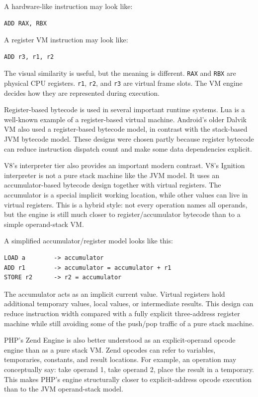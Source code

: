 \documentclass[a4paper,twoside]{report}
\begin{document}
A hardware-like instruction may look like:

\begin{verbatim}
ADD RAX, RBX
\end{verbatim}

A register VM instruction may look like:

\begin{verbatim}
ADD r3, r1, r2
\end{verbatim}

The visual similarity is useful, but the meaning is different. \texttt{RAX} and \texttt{RBX} are physical CPU registers. \texttt{r1}, \texttt{r2}, and \texttt{r3} are virtual frame slots. The VM engine decides how they are represented during execution.

Register-based bytecode is used in several important runtime systems. Lua is a well-known example of a register-based virtual machine. Android's older Dalvik VM also used a register-based bytecode model, in contrast with the stack-based JVM bytecode model. These designs were chosen partly because register bytecode can reduce instruction dispatch count and make some data dependencies explicit.

V8's interpreter tier also provides an important modern contrast. V8's Ignition interpreter is not a pure stack machine like the JVM model. It uses an accumulator-based bytecode design together with virtual registers. The accumulator is a special implicit working location, while other values can live in virtual registers. This is a hybrid style: not every operation names all operands, but the engine is still much closer to register/accumulator bytecode than to a simple operand-stack VM.

A simplified accumulator/register model looks like this:

\begin{verbatim}
LOAD a        -> accumulator
ADD r1        -> accumulator = accumulator + r1
STORE r2      -> r2 = accumulator
\end{verbatim}

The accumulator acts as an implicit current value. Virtual registers hold additional temporary values, local values, or intermediate results. This design can reduce instruction width compared with a fully explicit three-address register machine while still avoiding some of the push/pop traffic of a pure stack machine.

PHP's Zend Engine is also better understood as an explicit-operand opcode engine than as a pure stack VM. Zend opcodes can refer to variables, temporaries, constants, and result locations. For example, an operation may conceptually say: take operand 1, take operand 2, place the result in a temporary. This makes PHP's engine structurally closer to explicit-address opcode execution than to the JVM operand-stack model.
\end{document}
